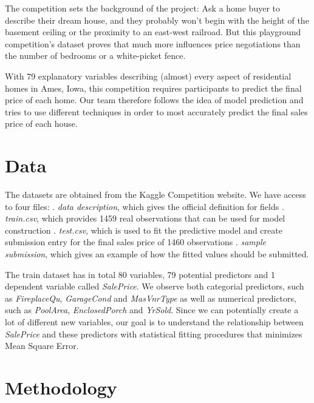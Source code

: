 \documentclass[a4paper]{article}
\begin{document}
\begin{flushleft}
The competition sets the background of the project: Ask a home buyer to describe their dream house, and they probably won't begin with the height of the basement ceiling or the proximity to an east-west railroad. But this playground competition's dataset proves that much more influences price negotiations than the number of bedrooms or a white-picket fence. \newline

With 79 explanatory variables describing (almost) every aspect of residential homes in Ames, Iowa, this competition requires participants to predict the final price of each home. Our team therefore follows the idea of model prediction and tries to use different techniques in order to most accurately predict the final sales price of each house. \newline


\section{Data}

The datasets are obtained from the Kaggle Competition website. We have access to four files: . \textit{data description}, which gives the official definition for fields . \textit{train.csv}, which provides 1459 real observations that can be used for model construction . \textit{test.csv}, which is used to fit the predictive model and create submission entry for the final sales price of 1460 observations . \textit{sample submission}, which gives an example of how the fitted values should be submitted. \newline

The train dataset has in total 80 variables, 79 potential predictors and 1 dependent variable called \textit{SalePrice}. We observe both categorial predictors, such as \textit{FireplaceQu}, \textit{GarageCond} and \textit{MasVnrType} as well as numerical predictors, such as \textit{PoolArea}, \textit{EnclosedPorch} and \textit{YrSold}. Since we can potentially create a lot of different new variables, our goal is to understand the relationship between \textit{SalePrice} and these predictors with statistical fitting procedures that minimizes Mean Square Error.


\section{Methodology}


\end{flushleft}
\end{document}
